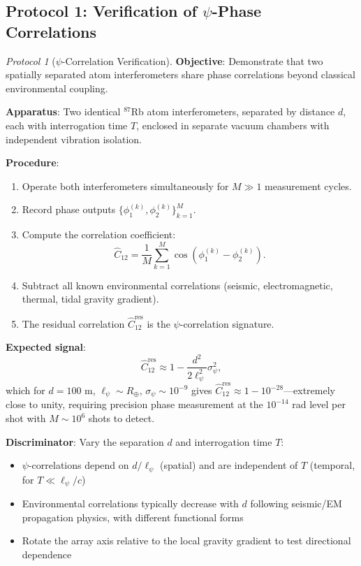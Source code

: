 \documentclass[12pt,a4paper]{article}
\theoremstyle{remark}
\newtheorem{protocol}{Protocol}
\begin{document}
\subsection{Protocol 1: Verification of $\psi$-Phase Correlations}

\begin{protocol}[$\psi$-Correlation Verification]\label{prot:corr-verify}
\textbf{Objective}: Demonstrate that two spatially separated atom
interferometers share phase correlations beyond classical environmental
coupling.

\textbf{Apparatus}: Two identical $^{87}$Rb atom interferometers, separated
by distance $d$, each with interrogation time $T$, enclosed in separate
vacuum chambers with independent vibration isolation.

\textbf{Procedure}:
\begin{enumerate}
\item Operate both interferometers simultaneously for $M \gg 1$ measurement
cycles.
\item Record phase outputs $\{\phi_1^{(k)}, \phi_2^{(k)}\}_{k=1}^M$.
\item Compute the correlation coefficient:
\begin{equation}
\hat{C}_{12} = \frac{1}{M}\sum_{k=1}^M \cos(\phi_1^{(k)} - \phi_2^{(k)}).
\end{equation}
\item Subtract all known environmental correlations (seismic, electromagnetic,
thermal, tidal gravity gradient).
\item The residual correlation $\hat{C}_{12}^{\text{res}}$ is the
$\psi$-correlation signature.
\end{enumerate}

\textbf{Expected signal}:
\begin{equation}
\hat{C}_{12}^{\text{res}} \approx 1 - \frac{d^2}{2\ell_\psi^2}\sigma_\psi^2,
\end{equation}
which for $d = 100$ m, $\ell_\psi \sim R_\oplus$, $\sigma_\psi \sim 10^{-9}$
gives $\hat{C}_{12}^{\text{res}} \approx 1 - 10^{-28}$---extremely close
to unity, requiring precision phase measurement at the $10^{-14}$ rad level
per shot with $M \sim 10^6$ shots to detect.

\textbf{Discriminator}: Vary the separation $d$ and interrogation time $T$:
\begin{itemize}
\item $\psi$-correlations depend on $d/\ell_\psi$ (spatial) and are
independent of $T$ (temporal, for $T \ll \ell_\psi/c$)
\item Environmental correlations typically decrease with $d$ following
seismic/EM propagation physics, with different functional forms
\item Rotate the array axis relative to the local gravity gradient to
test directional dependence
\end{itemize}
\end{protocol}
\end{document}
